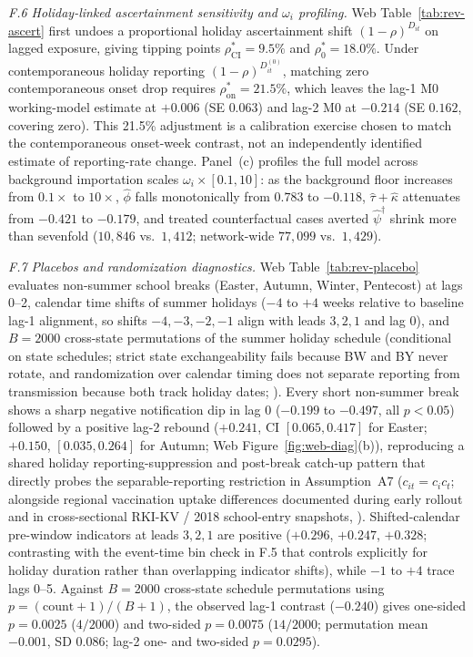 

\emph{F.6 Holiday-linked ascertainment sensitivity and $\omega_i$ profiling.}
Web Table~\ref{tab:rev-ascert} first undoes a proportional holiday ascertainment shift
$(1-\rho)^{D_{it}}$ on lagged exposure, giving tipping points $\rho^*_{\mathrm{CI}}=9.5\%$ and
$\rho^*_0=18.0\%$. Under contemporaneous holiday reporting $(1-\rho)^{D_{it}^{(0)}}$, matching zero
contemporaneous onset drop requires $\rho^*_{\mathrm{on}}=21.5\%$, which leaves the lag-1 M0
working-model estimate at $+0.006$ (SE $0.063$) and lag-2 M0 at $-0.214$ (SE $0.162$, covering
zero). This 21.5\% adjustment is a calibration exercise chosen to match the contemporaneous
onset-week contrast, not an independently identified estimate of reporting-rate change. Panel~(c)
profiles the full model across background importation scales $\omega_i\times[0.1,10]$: as the
background floor increases from $0.1\times$ to $10\times$, $\hat\phi$ falls monotonically from
$0.783$ to $-0.118$, $\hat\tau+\hat\kappa$ attenuates from $-0.421$ to $-0.179$, and treated
counterfactual cases averted $\hat\psi^\dagger$ shrink more than sevenfold ($10{,}846$ vs.\
$1{,}412$; network-wide $77{,}099$ vs.\ $1{,}429$).



\emph{F.7 Placebos and randomization diagnostics.} Web Table~\ref{tab:rev-placebo} evaluates
non-summer school breaks (Easter, Autumn, Winter, Pentecost) at lags 0--2, calendar time shifts of
summer holidays ($-4$ to $+4$ weeks relative to baseline lag-1 alignment, so shifts $-4,-3,-2,-1$
align with leads $3,2,1$ and lag $0$), and $B=2000$ cross-state permutations of the summer holiday
schedule (conditional on state schedules; strict state exchangeability fails because BW and BY never
rotate, and randomization over calendar timing does not separate reporting from transmission because
both track holiday dates; \citealp{vonbismarckosten2022schools}). Every short non-summer break
shows a sharp negative notification dip in lag 0 ($-0.199$ to $-0.497$, all $p<0.05$) followed by a
positive lag-2 rebound ($+0.241$, CI $[0.065,0.417]$ for Easter; $+0.150$, $[0.035,0.264]$ for
Autumn; Web Figure~\ref{fig:web-diag}(b)), reproducing a shared holiday reporting-suppression and
post-break catch-up pattern that directly probes the separable-reporting restriction in
Assumption~A7 ($c_{it}=c_i c_t$; alongside regional vaccination uptake differences documented during
early rollout and in cross-sectional RKI-KV / 2018 school-entry snapshots,
\citealp{siedler2010varicella,reuss2010varicella,rieck2020impfquoten}). Shifted-calendar pre-window
indicators at leads $3,2,1$ are positive ($+0.296$, $+0.247$, $+0.328$; contrasting with the
event-time bin check in F.5 that controls explicitly for holiday duration rather than overlapping
indicator shifts), while $-1$ to $+4$ trace lags 0--5. Against $B=2000$ cross-state schedule
permutations using $p=(\mathrm{count}+1)/(B+1)$, the observed lag-1 contrast ($-0.240$) gives
one-sided $p=0.0025$ ($4/2000$) and two-sided $p=0.0075$ ($14/2000$; permutation mean $-0.001$, SD
$0.086$; lag-2 one- and two-sided $p=0.0295$).


